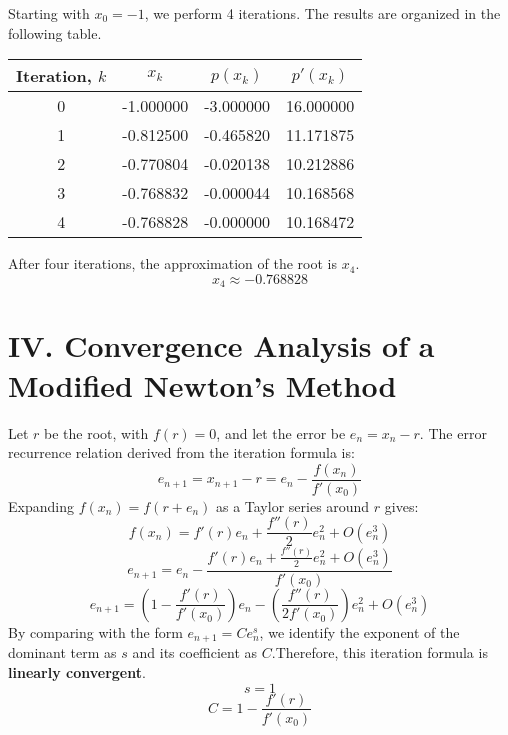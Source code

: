 \documentclass[a4paper]{article}
\begin{document}
Starting with $x_0 = -1$, we perform 4 iterations. The results are organized in the following table. 

\begin{center}
\begin{tabular}{c | c c c}
\hline
Iteration, $k$ & $x_k$ & $p(x_k)$ & $p'(x_k)$ \\
\hline
0 & -1.000000 & -3.000000 & 16.000000 \\
1 & -0.812500 & -0.465820 & 11.171875 \\
2 & -0.770804 & -0.020138 & 10.212886 \\
3 & -0.768832 & -0.000044 & 10.168568 \\
4 & -0.768828 & -0.000000 & 10.168472 \\
\hline
\end{tabular}
\end{center}

After four iterations, the approximation of the root is $x_4$.
\[
x_4 \approx -0.768828
\]


\section*{IV. Convergence Analysis of a Modified Newton's Method}

Let $r$ be the root, with $f(r)=0$, and let the error be $e_n = x_n - r$.
The error recurrence relation derived from the iteration formula is:
\[
e_{n+1} = x_{n+1} - r = e_n - \frac{f(x_n)}{f'(x_0)}
\]
Expanding $f(x_n) = f(r+e_n)$ as a Taylor series around $r$ gives:
\[
f(x_n) = f'(r)e_n + \frac{f''(r)}{2}e_n^2 + O(e_n^3)
\]
\[
e_{n+1} = e_n - \frac{f'(r)e_n + \frac{f''(r)}{2}e_n^2 + O(e_n^3)}{f'(x_0)}
\]
\[
e_{n+1} = \left(1 - \frac{f'(r)}{f'(x_0)}\right)e_n - \left(\frac{f''(r)}{2f'(x_0)}\right)e_n^2 + O(e_n^3)
\]
By comparing with the form $e_{n+1} = Ce_n^s$, we identify the exponent of the dominant term as $s$ and its coefficient as $C$.Therefore, this iteration formula is \textbf{linearly convergent}.
\[
s = 1
\]
\[
C = 1 - \frac{f'(r)}{f'(x_0)}
\]

\end{document}
